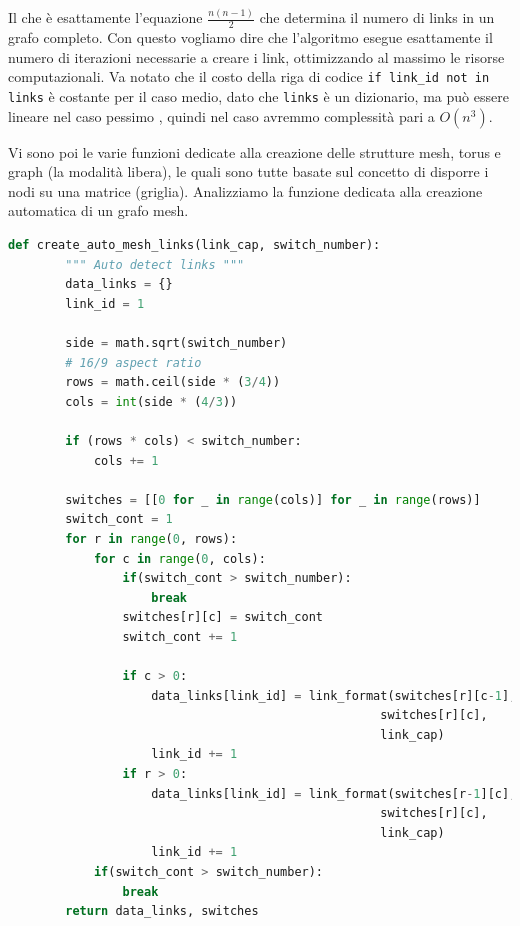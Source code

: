\documentclass[binding=0.6cm]{sapthesis}
\begin{document}
Il che è esattamente l'equazione \(\frac{n(n-1)}{2}\) che determina il numero di links in un grafo completo. Con questo vogliamo dire che 
l'algoritmo esegue esattamente il numero di iterazioni necessarie a creare i link, ottimizzando al massimo le risorse computazionali. Va notato
che il costo della riga di codice \lstinline|if link_id not in links| è costante per il caso medio, dato che \texttt{links} è un dizionario, ma
può essere lineare nel caso pessimo \cite{PythonWikiTimeComplexity}, quindi nel caso avremmo complessità pari a \(O(n^3)\).

Vi sono poi le varie funzioni dedicate alla creazione delle strutture mesh, torus e graph (la modalità libera), le quali sono tutte basate sul concetto di
disporre i nodi su una matrice (griglia).
Analizziamo la funzione dedicata alla creazione automatica di un grafo mesh.

{\scriptsize %
\begin{lstlisting}[language=Python, basicstyle=\ttfamily, caption={Funzione per la creazione automatica di un grafo mesh}, label={codice:create_auto_mesh_links}]
    def create_auto_mesh_links(link_cap, switch_number):
        """ Auto detect links """
        data_links = {}
        link_id = 1

        side = math.sqrt(switch_number)
        # 16/9 aspect ratio
        rows = math.ceil(side * (3/4))
        cols = int(side * (4/3))

        if (rows * cols) < switch_number:
            cols += 1

        switches = [[0 for _ in range(cols)] for _ in range(rows)]
        switch_cont = 1
        for r in range(0, rows):
            for c in range(0, cols):
                if(switch_cont > switch_number):
                    break
                switches[r][c] = switch_cont
                switch_cont += 1

                if c > 0:
                    data_links[link_id] = link_format(switches[r][c-1], 
                                                    switches[r][c], 
                                                    link_cap)
                    link_id += 1
                if r > 0:
                    data_links[link_id] = link_format(switches[r-1][c], 
                                                    switches[r][c], 
                                                    link_cap)
                    link_id += 1
            if(switch_cont > switch_number):
                break
        return data_links, switches
\end{lstlisting}
} %
\end{document}
